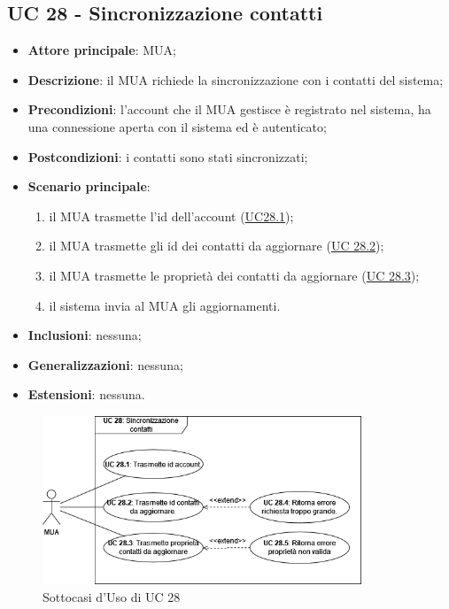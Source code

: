 
\subsection{UC 28 - Sincronizzazione contatti} \label{sec:UC28}
    
    \begin{itemize}
        \item \textbf{Attore principale}: MUA;
        \item \textbf{Descrizione}: il MUA richiede la sincronizzazione con i contatti del sistema;
        \item \textbf{Precondizioni}: l’account che il MUA gestisce è registrato nel sistema, ha una connessione aperta con il sistema ed è autenticato;
        \item \textbf{Postcondizioni}: i contatti sono stati sincronizzati;
        \item \textbf{Scenario principale}:
            \begin{enumerate}
                \item il MUA trasmette l'id dell'account (\hyperref[sec:UC28.1]{UC28.1});
                \item il MUA trasmette gli id dei contatti da aggiornare (\hyperref[sec:UC28.2]{UC 28.2});
                \item il MUA trasmette le proprietà dei contatti da aggiornare (\hyperref[sec:UC28.3]{UC 28.3});
                \item il sistema invia al MUA gli aggiornamenti.
            \end{enumerate}
        \item \textbf{Inclusioni}: nessuna;
        \item \textbf{Generalizzazioni}: nessuna;
        \item \textbf{Estensioni}: nessuna.
    \end{itemize}

    \begin{figure}[H]
        \includegraphics[width=0.85\textwidth]{sections/uc_imgs/UC28.png}
        \centering
        \caption{Sottocasi d'Uso di UC 28}
    \end{figure}

